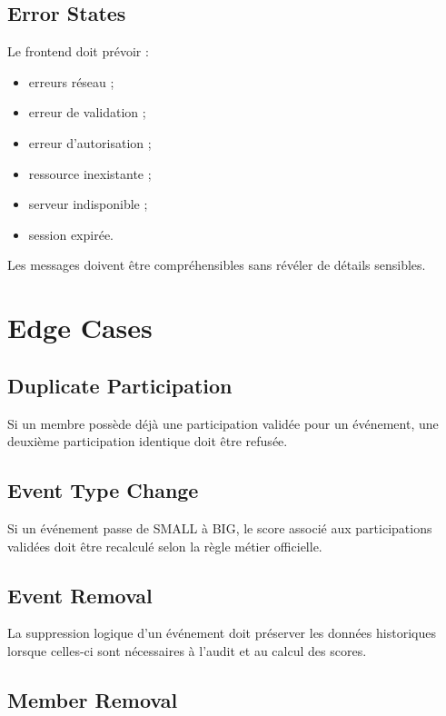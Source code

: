 \documentclass[11pt,a4paper]{report}
\begin{document}
\section{Error States}

Le frontend doit prévoir :

\begin{itemize}
    \item erreurs réseau ;
    \item erreur de validation ;
    \item erreur d'autorisation ;
    \item ressource inexistante ;
    \item serveur indisponible ;
    \item session expirée.
\end{itemize}

Les messages doivent être compréhensibles sans révéler de détails sensibles.

\chapter{Edge Cases}

\section{Duplicate Participation}

Si un membre possède déjà une participation validée pour un événement, une deuxième participation identique doit être refusée.

\section{Event Type Change}

Si un événement passe de SMALL à BIG, le score associé aux participations validées doit être recalculé selon la règle métier officielle.

\section{Event Removal}

La suppression logique d'un événement doit préserver les données historiques lorsque celles-ci sont nécessaires à l'audit et au calcul des scores.

\section{Member Removal}
\end{document}
